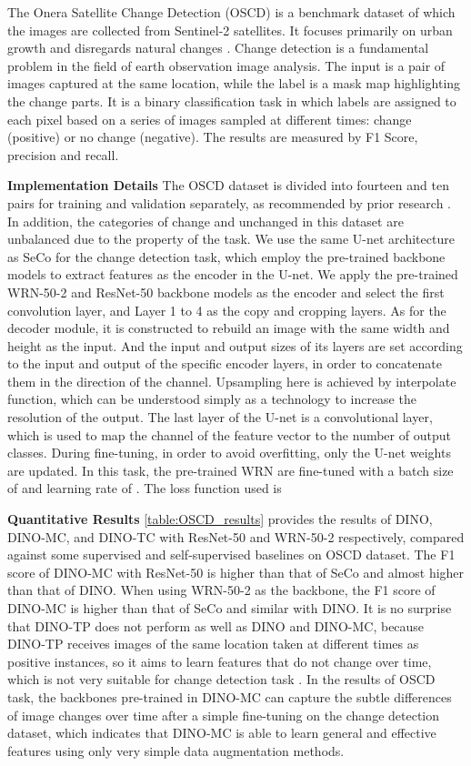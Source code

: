\documentclass[10pt,twocolumn,letterpaper]{article}
\begin{document}
The Onera Satellite Change Detection (OSCD) is a benchmark dataset of which the images are collected from Sentinel-2 satellites. 
It focuses primarily on urban growth and disregards natural changes \cite{daudt2018urban}. 
Change detection is a fundamental problem in the field of earth observation image analysis.
The input is a pair of images captured at the same location, while the label is a mask map highlighting the change parts.
It is a binary classification task in which labels are assigned to each pixel based on a series of images sampled at different times: change (positive) or no change (negative).
The results are measured by F1 Score, precision and recall.

\textbf{Implementation Details }
The OSCD dataset is divided into fourteen and ten pairs for training and validation separately, as recommended by prior research \cite{daudt2018urban, manas2021seasonal}.
In addition, the categories of change and unchanged in this dataset are unbalanced due to the property of the task.
We use the same U-net architecture as SeCo for the change detection task, which employ the pre-trained backbone models to extract features as the encoder in the U-net.
We apply the pre-trained WRN-50-2 and ResNet-50 backbone models as the encoder and select the first convolution layer, and Layer 1 to 4 as the copy and cropping layers.
As for the decoder module, it is  constructed  to rebuild an image with the same width and height as the input.
And the input and output sizes of its layers are set according to the input and output of the specific encoder layers, in order to concatenate them in the direction of the channel.
Upsampling here is achieved by interpolate function, which can be understood simply as a technology to increase the resolution of the output.
The last layer of the U-net is a  convolutional layer, which is used to map the channel of the feature vector to the number of output classes.
During fine-tuning, in order to avoid overfitting, only the U-net weights are updated.
In this task, the pre-trained WRN are fine-tuned with a batch size of  and learning rate of .
The loss function used is 

\textbf{Quantitative Results}
\cref{table:OSCD_results} provides the results of DINO, DINO-MC, and DINO-TC with ResNet-50 and WRN-50-2 respectively, compared against some supervised and self-supervised baselines on OSCD dataset.
The F1 score of DINO-MC with ResNet-50 is  higher than that of SeCo and almost  higher than that of DINO.
When using WRN-50-2 as the backbone, the F1 score of DINO-MC is  higher than that of SeCo and similar with DINO.
It is no surprise that DINO-TP does not perform as well as DINO and DINO-MC, because DINO-TP receives images of the same location taken at different times as positive instances, so it aims to learn features that do not change over time, which is not very suitable for change detection task \cite{manas2021seasonal}.
In the results of OSCD task, the backbones pre-trained in DINO-MC can capture the subtle differences of image changes over time after a simple fine-tuning on the change detection dataset, which indicates that DINO-MC is able to learn general and effective features using only very simple data augmentation methods.
\end{document}
